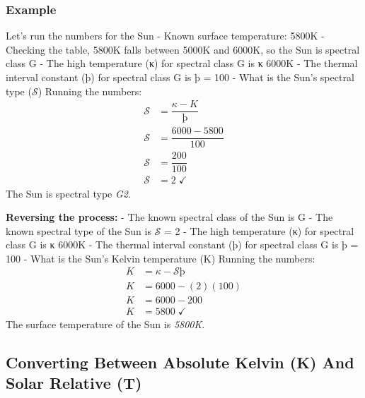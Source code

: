 \documentclass[
  letterpaper,
]{book}
\begin{document}
\subsubsection{Example}\label{example-4}

Let's run the numbers for the Sun - Known surface temperature: 5800K -
Checking the table, 5800K falls between 5000K and 6000K, so the Sun is
spectral class G - The high temperature (κ) for spectral class G is κ
6000K - The thermal interval constant (þ) for spectral class G is þ =
100 - What is the Sun's spectral type (\(\mathcal{S}\)) Running the
numbers: \[
\begin{align}
\mathcal{S} &= \dfrac{\kappa - K}{þ} \\
\mathcal{S} &= \dfrac{6000 - 5800}{100} \\
\mathcal{S} &= \dfrac{200}{100} \\
\mathcal{S} &= 2\;✓
\end{align}
\] The Sun is spectral type \emph{G2}.

\textbf{Reversing the process:} - The known spectral class of the Sun is
G - The known spectral type of the Sun is \(\mathcal{S}\) = 2 - The high
temperature (κ) for spectral class G is κ 6000K - The thermal interval
constant (þ) for spectral class G is þ = 100 - What is the Sun's Kelvin
temperature (K) Running the numbers: \[
\begin{align}
K &= \kappa - \mathcal{S} þ \\
K &= 6000 - (2)(100) \\
K &= 6000 - 200 \\
K &= 5800\;✓
\end{align}
\] The surface temperature of the Sun is \emph{5800K}.

\subsection{Converting Between Absolute Kelvin (K) And Solar Relative
(T)}\label{converting-between-absolute-kelvin-k-and-solar-relative-t}
\end{document}

